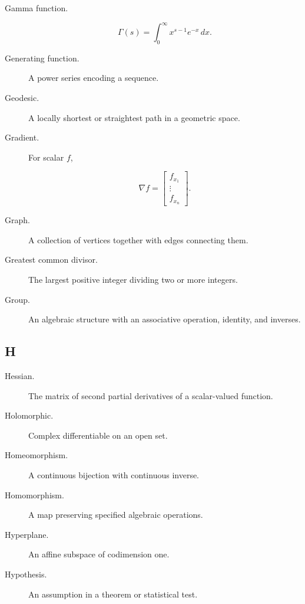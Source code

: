 \begin{description}

\item[Gamma function.]

\[
\Gamma(s)
=
\int_0^\infty
x^{s-1}e^{-x}\,dx.
\]

\item[Generating function.]
A power series encoding a sequence.

\item[Geodesic.]
A locally shortest or straightest path in a geometric space.

\item[Gradient.]
For scalar \(f\),

\[
\nabla f
=
\begin{bmatrix}
f_{x_1}\\
\vdots\\
f_{x_n}
\end{bmatrix}.
\]

\item[Graph.]
A collection of vertices together with edges connecting them.

\item[Greatest common divisor.]
The largest positive integer dividing two or more integers.

\item[Group.]
An algebraic structure with an associative operation, identity, and inverses.

\end{description}

\subsection*{H}

\begin{description}

\item[Hessian.]
The matrix of second partial derivatives of a scalar-valued function.

\item[Holomorphic.]
Complex differentiable on an open set.

\item[Homeomorphism.]
A continuous bijection with continuous inverse.

\item[Homomorphism.]
A map preserving specified algebraic operations.

\item[Hyperplane.]
An affine subspace of codimension one.

\item[Hypothesis.]
An assumption in a theorem or statistical test.

\end{description}

